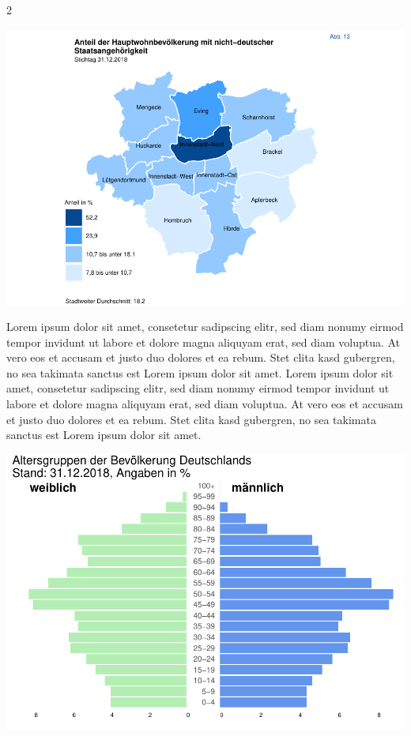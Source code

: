 \documentclass[
  a4paper,
  twoside]{article}
\begin{document}
\begin {multicols}{2}

\begin{flushright}\includegraphics[width=1\linewidth]{2021-03-02_Beispiel_files/figure-latex/Plot map-1} \end{flushright}

Lorem ipsum dolor sit amet, consetetur sadipscing elitr, sed diam nonumy eirmod tempor invidunt ut labore et dolore magna aliquyam erat, sed diam voluptua. At vero eos et accusam et justo duo dolores et ea rebum. Stet clita kasd gubergren, no sea takimata sanctus est Lorem ipsum dolor sit amet. Lorem ipsum dolor sit amet, consetetur sadipscing elitr, sed diam nonumy eirmod tempor invidunt ut labore et dolore magna aliquyam erat, sed diam voluptua. At vero eos et accusam et justo duo dolores et ea rebum. Stet clita kasd gubergren, no sea takimata sanctus est Lorem ipsum dolor sit amet.

\columnbreak

\begin{flushright}\includegraphics[width=1\linewidth]{2021-03-02_Beispiel_files/figure-latex/plot Pyramide 2-spaltig-1} \end{flushright}


\end{multicols}
\end{document}
